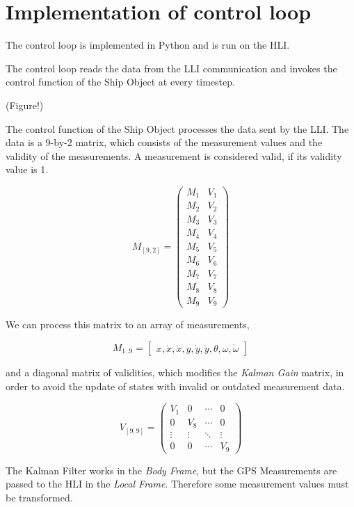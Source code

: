 \section{Implementation of control loop}

The control loop is implemented in Python and is run on the HLI.

The control loop reads the data from the LLI communication and invokes the control function of the Ship Object at every timestep.

(Figure!)

The control function of the Ship Object processes the data sent by the LLI. The data is a 9-by-2 matrix, which consists of the measurement values and the validity of the measurements. A measurement is considered valid, if its validity value is 1.

$$M_{[9,2]} =
  \begin{pmatrix}
   M_1 & V_1 \\
   M_2 & V_2 \\
   M_3 & V_3 \\
   M_4 & V_4 \\
   M_5 & V_5 \\
   M_6 & V_6 \\
   M_7 & V_7 \\
   M_8 & V_8 \\
   M_9 & V_9
  \end{pmatrix}
$$

We can process this matrix to an array of measurements,

$$M_{1..9} = 
	\begin{bmatrix}
	x, \dot{x}, \ddot{x}, y, \dot{y}, \ddot{y}, \theta, \omega, \dot{\omega}
	\end{bmatrix}$$

and a diagonal matrix of validities, which modifies the \emph{Kalman Gain} matrix, in order to avoid the update of states with invalid or outdated measurement data.

$$
V_{[9,9]} =
  \begin{pmatrix}
   V_1 & 0 & \cdots & 0 \\
   0 & V_8 & \cdots & 0 \\
   \vdots  & \vdots  & \ddots & \vdots  \\
   0 & 0 & \cdots & V_9
  \end{pmatrix}
$$

The Kalman Filter works in the \emph{Body Frame}, but the GPS Measurements are passed to the HLI in the \emph{Local Frame}. Therefore some measurement values must be transformed.


